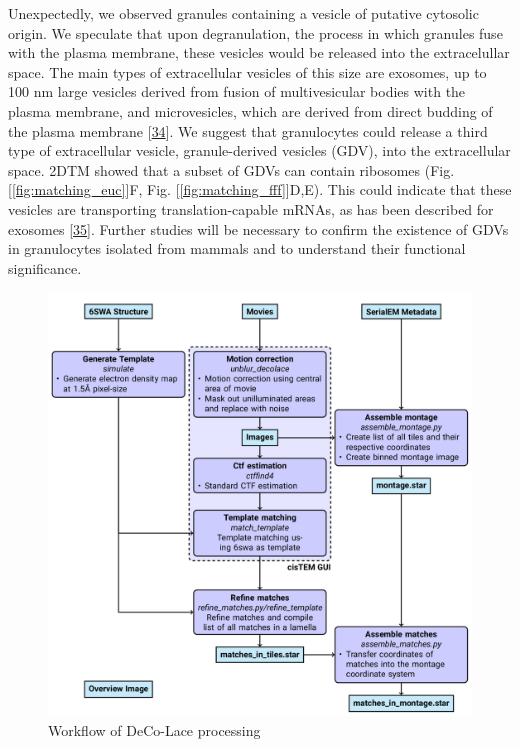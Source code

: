 \documentclass[
]{article}
\begin{document}
Unexpectedly, we observed granules containing a vesicle of putative cytosolic origin. We speculate that upon degranulation, the process in which granules fuse with the plasma membrane, these vesicles would be released into the extracelullar space. The main types of extracellular vesicles of this size are exosomes, up to 100 nm large vesicles derived from fusion of multivesicular bodies with the plasma membrane, and microvesicles, which are derived from direct budding of the plasma membrane {[}\protect\hyperlink{ref-kncnYGLD}{34}{]}. We suggest that granulocytes could release a third type of extracellular vesicle, granule-derived vesicles (GDV), into the extracellular space. 2DTM showed that a subset of GDVs can contain ribosomes (Fig. {[}\ref{fig:matching_euc}{]}F, Fig. {[}\ref{fig:matching_fff}{]}D,E). This could indicate that these vesicles are transporting translation-capable mRNAs, as has been described for exosomes {[}\protect\hyperlink{ref-agVdpX76}{35}{]}. Further studies will be necessary to confirm the existence of GDVs in granulocytes isolated from mammals and to understand their functional significance.

\begin{figure}
\hypertarget{fig:deco_lace_workflow}{%
\centering
\includegraphics{figures/deco_lace_workflow.png}
\caption{Workflow of DeCo-Lace processing}\label{fig:deco_lace_workflow}
}
\end{figure}
\end{document}
